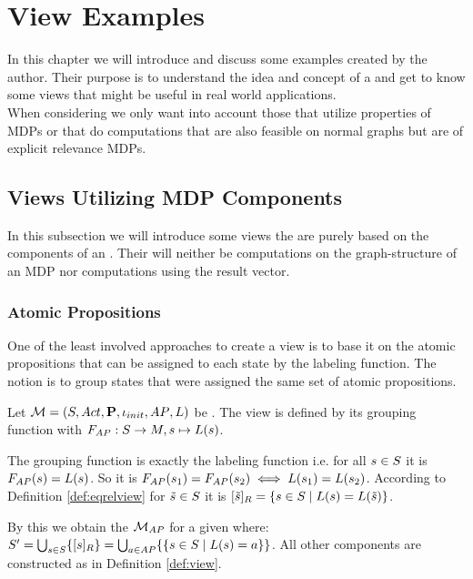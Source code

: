 \documentclass[preview]{standalone}
\begin{document}
\section{View Examples}
In this chapter we will introduce and discuss some \viewN examples created by the author. Their purpose is to understand the idea and concept of a \viewN and get to know some views that might be useful in real world applications. \\
When considering \viewsN we only want into account those that utilize properties of MDPs or that do computations that are also feasible on normal graphs but are of explicit relevance MDPs.
\subsection{Views Utilizing MDP Components}
In this subsection we will introduce some views the are purely based on the components of an \mdpN. Their will neither be computations on the graph-structure of an MDP nor computations using the result vector.
\subsubsection{Atomic Propositions}
One of the least involved approaches to create a view is to base it on the atomic propositions that can be assigned to each state by the labeling function. The notion is to group states that were assigned the same set of atomic propositions. 


\begin{definition}	
	Let ${{{\mathcal{M}}}} = {{({S}, {Act}, {\textbf{P}}, {\iota_{init}}, {AP}, {L})}}$ be \chosengraphtypeN. The view \viewatomicprops is defined by its grouping function \gfctatomicprops \grpfctN with $\gfctatomicprops : \states \to \imggrp, {\state}\mapsto{\labelingfct(\state)}$.
\end{definition}

The grouping function is exactly the labeling function i.e. for all ${s} \in {S}$ it is ${{F_{{AP}}}}({s}) = {L}({s})$. So it is ${{F_{{AP}}}}({s}_1) = {{F_{{AP}}}}({s}_2) \iff {L}({s}_1) = {L}({s}_2)$. According to Definition \ref{def:eqrelview} for ${\tilde{{s}}} \in {S}$ it is ${{[{\tilde{{s}}}]_{{R}}}} = \{{s} \in {S} \mid {L}({s}) = {L}({\tilde{{s}}})\}$.

By this we obtain the \viewN ${{{{{\mathcal{M}}}}_{{AP}}}}$ for a given \chosengraphtypeN \chgph where: ${S}' = \bigcup_{{s} \in {S}} \{{{[{s}]_{{R}}}}\} =  \bigcup_{a \in {AP}} \{\{{s} \in {S} \mid {L}({s}) = a\}\}$. All other components are constructed as in Definition \ref{def:view}.
\end{document}
